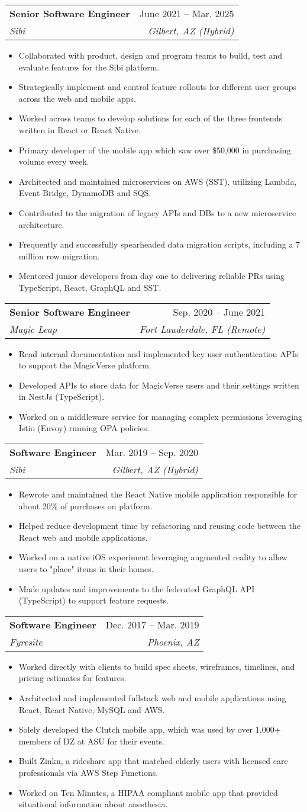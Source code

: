 \documentclass[letterpaper,11pt]{article}
\makeatletter
\newcommand{\resumeItem}[1]{
  \item\small{
    {#1 \vspace{-2pt}}
  }
}
\newcommand{\resumeSubheading}[4]{
  \vspace{-2pt}\item
    \begin{tabular*}{0.97\textwidth}[t]{l@{\extracolsep{\fill}}r}
      \textbf{#1} & #2 \\
      \textit{\small#3} & \textit{\small #4} \\
    \end{tabular*}\vspace{-7pt}
}
\newcommand{\resumeItemListStart}{\begin{itemize}}
\newcommand{\resumeItemListEnd}{\end{itemize}\vspace{-5pt}}
\makeatother
\begin{document}
    \resumeSubheading
      {Senior Software Engineer}{June 2021 -- Mar. 2025}
      {Sibi}{Gilbert, AZ (Hybrid)}
      \resumeItemListStart
        \resumeItem{Collaborated with product, design and program teams to build, test and evaluate features for the Sibi platform.}
        \resumeItem{Strategically implement and control feature rollouts for different user groups across the web and mobile apps.}
        \resumeItem{Worked across teams to develop solutions for each of the three frontends written in React or React Native.}
        \resumeItem{Primary developer of the mobile app which saw over \$50,000 in purchasing volume every week.}
        \resumeItem{Architected and maintained microservices on AWS (SST), utilizing Lambda, Event Bridge, DynamoDB and SQS.}
        \resumeItem{Contributed to the migration of legacy APIs and DBs to a new microservice architecture.}
        \resumeItem{Frequently and successfully spearheaded data migration scripts, including a 7 million row migration.}
        \resumeItem{Mentored junior developers from day one to delivering reliable PRs using TypeScript, React, GraphQL and SST.}
      \resumeItemListEnd

    \resumeSubheading
      {Senior Software Engineer}{Sep. 2020 -- June 2021}
      {Magic Leap}{Fort Lauderdale, FL (Remote)}
      \resumeItemListStart
        \resumeItem{Read internal documentation and implemented key user authentication APIs to support the MagicVerse platform.}
        \resumeItem{Developed APIs to store data for MagicVerse users and their settings written in NestJs (TypeScript).}
        \resumeItem{Worked on a middleware service for managing complex permissions leveraging Istio (Envoy) running OPA policies.}
      \resumeItemListEnd

    \resumeSubheading
      {Software Engineer}{Mar. 2019 -- Sep. 2020}
      {Sibi}{Gilbert, AZ (Hybrid)}
      \resumeItemListStart
        \resumeItem{Rewrote and maintained the React Native mobile application responsible for about 20\% of purchases on platform.}
        \resumeItem{Helped reduce development time by refactoring and reusing code between the React web and mobile applications.}
        \resumeItem{Worked on a native iOS experiment leveraging augmented reality to allow users to "place" items in their homes.}
        \resumeItem{Made updates and improvements to the federated GraphQL API (TypeScript) to support feature requests.}
      \resumeItemListEnd

    \resumeSubheading
      {Software Engineer}{Dec. 2017 -- Mar. 2019}
      {Fyresite}{Phoenix, AZ}
      \resumeItemListStart
        \resumeItem{Worked directly with clients to build spec sheets, wireframes, timelines, and pricing estimates for features.}
        \resumeItem{Architected and implemented fullstack web and mobile applications using React, React Native, MySQL and AWS.}
        \resumeItem{Solely developed the Clutch mobile app, which was used by over 1,000+ members of DZ at ASU for their events.}
        \resumeItem{Built Zinkn, a rideshare app that matched elderly users with licensed care professionals via AWS Step Functions.}
        \resumeItem{Worked on Ten Minutes, a HIPAA compliant mobile app that provided situational information about anesthesia.}
      \resumeItemListEnd
\end{document}
